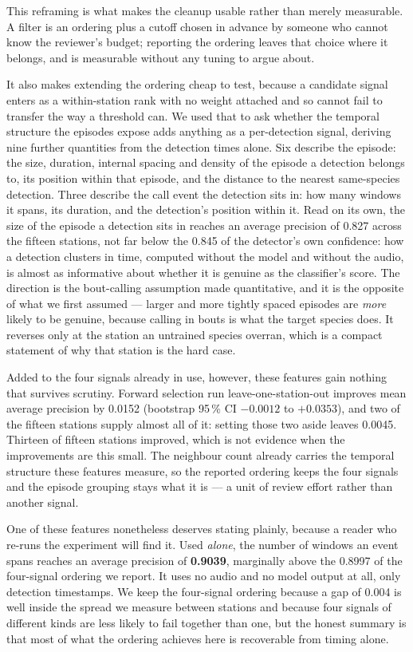 \documentclass[review,3p,times]{elsarticle}
\begin{document}
This reframing is what makes the cleanup usable rather than merely measurable.
A filter is an ordering plus a cutoff chosen in advance by someone who cannot
know the reviewer's budget; reporting the ordering leaves that choice where it
belongs, and is measurable without any tuning to argue about.

It also makes extending the ordering cheap to test, because a candidate signal
enters as a within-station rank with no weight attached and so cannot fail to
transfer the way a threshold can. We used that to ask whether the temporal
structure the episodes expose adds anything as a per-detection signal, deriving
nine further quantities from the detection times alone. Six describe the
episode: the size, duration, internal spacing and density of the episode a
detection belongs to, its position within that episode, and the distance to the
nearest same-species detection. Three describe the call event the detection sits
in: how many windows it spans, its duration, and the detection's position within
it.
Read on its own, the size of the episode a detection sits in reaches an average
precision of 0.827 across the fifteen stations, not far below the 0.845 of the
detector's own confidence: how a detection clusters in time, computed without
the model and without the audio, is almost as informative about whether it is
genuine as the classifier's score. The direction is the bout-calling assumption
made quantitative, and it is the opposite of what we first assumed --- larger and
more tightly spaced episodes are \emph{more} likely to be genuine, because
calling in bouts is what the target species does. It reverses only at the
station an untrained species overran, which is a compact statement of why that
station is the hard case.

Added to the four signals already in use, however, these features gain nothing
that survives scrutiny. Forward selection run leave-one-station-out improves
mean average precision by 0.0152 (bootstrap 95\,\% CI $-0.0012$ to $+0.0353$),
and two of the fifteen stations supply almost all of it: setting those two aside
leaves 0.0045. Thirteen of fifteen stations improved, which is not evidence when
the improvements are this small. The neighbour count already carries the
temporal structure these features measure, so the reported ordering keeps the
four signals and the episode grouping stays what it is --- a unit of review
effort rather than another signal.

One of these features nonetheless deserves stating plainly, because a reader who
re-runs the experiment will find it. Used \emph{alone}, the number of windows an
event spans reaches an average precision of \textbf{0.9039}, marginally above
the 0.8997 of the four-signal ordering we report. It uses no audio and no model
output at all, only detection timestamps. We keep the four-signal ordering
because a gap of 0.004 is well inside the spread we measure between stations and
because four signals of different kinds are less likely to fail together than
one, but the honest summary is that most of what the ordering achieves here is
recoverable from timing alone.
\end{document}
